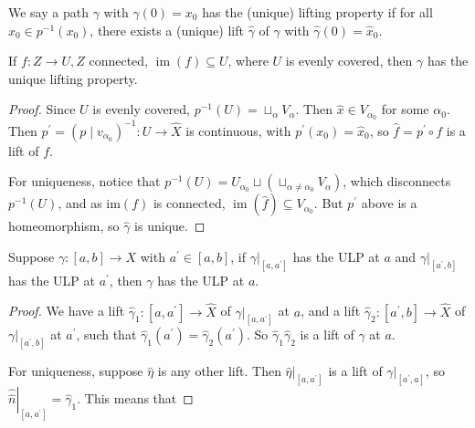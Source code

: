 \documentclass[a4paper, 10pt, twocolumn]{amsart}
\begin{document}
\begin{notation}
 We say a path $\gamma$ with $\gamma(0)=x_0$ has the (unique) lifting property if for all $\hat{x}_0 \in p^{-1}\left(x_0\right)$, there exists a (unique) lift $\hat{\gamma}$ of $\gamma$ with $\hat{\gamma}(0)=\hat{x}_0$.
\end{notation}

\begin{lemma}
If $f: Z \rightarrow U, Z$ connected, $\operatorname{im}(f) \subseteq U$, where $U$ is evenly covered, then $\gamma$ has the unique lifting property.
\end{lemma}
\begin{proof}
Since $U$ is evenly covered, $p^{-1}(U)=\sqcup_\alpha V_\alpha$. Then $\hat{x} \in V_{\alpha_0}$ for some $\alpha_0$. Then $p^{\prime}=\left(p \mid v_{\alpha_0}\right)^{-1}: U \rightarrow \hat{X}$ is continuous, with $p^{\prime}\left(x_0\right)=\hat{x}_0$, so $\hat{f}=p^{\prime} \circ f$ is a lift of $f$.

For uniqueness, notice that $p^{-1}(U)=U_{\alpha_0} \sqcup\left(\sqcup_{\alpha \neq \alpha_0} V_\alpha\right)$, which disconnects $p^{-1}(U)$, and as $\mathrm{im}(f)$ is connected, $\operatorname{im}(\hat{f}) \subseteq V_{\alpha_0}$. But $p^{\prime}$ above is a homeomorphism, so $\hat{\gamma}$ is unique.
\end{proof}


\begin{lemma}
  Suppose $\gamma:[a, b] \rightarrow X$ with $a^{\prime} \in[a, b]$, if $\left.\gamma\right|_{\left[a, a^{\prime}\right]}$ has the ULP at $a$ and $\left.\gamma\right|_{\left[a^{\prime}, b\right]}$ has the ULP at $a^{\prime}$, then $\gamma$ has the ULP at $a$.
\end{lemma}
\begin{proof}
  We have a lift $\hat{\gamma}_1:\left[a, a^{\prime}\right] \rightarrow \hat{X}$ of $\left.\gamma\right|_{\left[a, a^{\prime}\right]}$ at $a$, and a lift $\hat{\gamma}_2:\left[a^{\prime}, b\right] \rightarrow \hat{X}$ of $\left.\gamma\right|_{\left[a^{\prime}, b\right]}$ at $a^{\prime}$, such that $\hat{\gamma}_1\left(a^{\prime}\right)=\hat{\gamma}_2\left(a^{\prime}\right)$. So $\hat{\gamma}_1 \hat{\gamma}_2$ is a lift of $\gamma$ at $a$.

For uniqueness, suppose $\hat{\eta}$ is any other lift. Then $\left.\hat{\eta}\right|_{\left[a, a^{\prime}\right]}$ is a lift of $\left.\gamma\right|_{\left[a^{\prime}, a\right]}$, so $\left.\hat{\hat{n}}\right|_{\left[a, a^{\prime}\right]}=\hat{\gamma}_1$. This means that
\end{proof}
\end{document}
